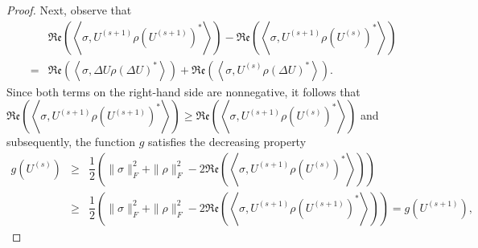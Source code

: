 \documentclass[sn-mathphys-num]{sn-jnl}%
\newcommand{\rinner}[1]{\mathfrak{Re}\left(\left<#1\right>\right)}
\newcommand{\inner}[1]{\left<#1\right>}
\theoremstyle{thmstyleone}%
\theoremstyle{thmstyletwo}%
\theoremstyle{thmstylethree}%
\begin{document}
\begin{proof}
Next, observe that 
    \begin{eqnarray*}
        &&\rinner{\sigma, U^{(s+1)}\rho \left(U^{(s+1)}\right)^*} -\rinner{\sigma, U^{(s+1)}\rho \left(U^{(s)}\right)^*} \\
        &=&  \rinner{\sigma, \Delta U\rho \left(\Delta U\right)^*}+\rinner{\sigma, U^{(s)}\rho \left(\Delta U\right)^*}.
    \end{eqnarray*}
Since both terms on the right-hand side are nonnegative, it follows that 
$\rinner{\sigma, U^{(s+1)}\rho \left(U^{(s+1)}\right)^*} \geq \rinner{\sigma, U^{(s+1)}\rho \left(U^{(s)}\right)^*}$ and subsequently, the function $g$ satisfies the decreasing property 
    \begin{eqnarray*}
        g(U^{(s)}) 
        &\geq&\dfrac{1}{2} \left(\|\sigma\|_F^2+\|\rho\|_F^2-2\rinner{\sigma, U^{(s+1)}\rho \left(U^{(s)}\right)^*}\right)\\
        &\geq&\dfrac{1}{2} \left(\|\sigma\|_F^2+\|\rho\|_F^2-2\rinner{\sigma, U^{(s+1)}\rho \left(U^{(s+1)}\right)^*}\right) = g(U^{(s+1)}),
    \end{eqnarray*}    
    
    

\end{proof}
\end{document}
